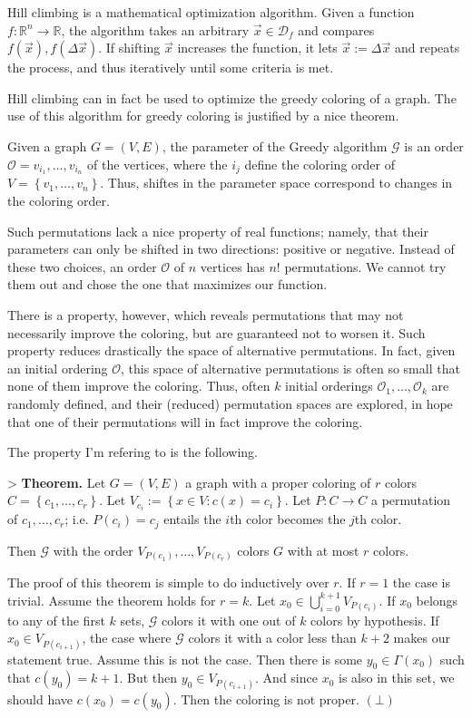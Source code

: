 \documentclass[a4paper, 12pt]{article}
\begin{document}
Hill climbing is a mathematical optimization algorithm. Given a function $f :
\mathbb{R}^n \to \mathbb{R}$, the algorithm takes an arbitrary
$\overrightarrow{x} \in \mathcal{D}_f$ and compares $f(\overrightarrow{x}),
f(\Delta \overrightarrow{x})$. If shifting $\overrightarrow{x}$ increases the
function, it lets $\overrightarrow{x} := \Delta\overrightarrow{x}$ and repeats
the process, and thus iteratively until some criteria is met.

Hill climbing can in fact be used to optimize the greedy coloring of a graph.
The use of this algorithm for greedy coloring is justified by a nice theorem.

Given a graph $G = (V, E)$, the parameter of the Greedy algorithm $\mathcal{G}$
is an order $\mathcal{O} = v_{i_1}, \ldots, v_{i_n}$ of the vertices, where the
$i_j$ define the coloring order of $V = \left\{ v_1, \ldots, v_n \right\} $.
Thus, shiftes in the parameter space correspond to changes
in the coloring order. 

Such permutations lack a nice property of real functions; namely, that their
parameters can only be shifted in two directions: positive or negative. Instead
of these two choices, an order $\mathcal{O}$ of $n$ vertices has $n!$
permutations. We cannot try them out and chose the one that maximizes our
function.

There is a property, however, which reveals permutations that may not
necessarily improve the coloring, but are guaranteed not to worsen it. Such
property reduces drastically the space of alternative permutations. In fact,
given an initial ordering $\mathcal{O}$, this space of alternative permutations
is often so small that none of them improve the coloring. Thus, often $k$
initial orderings $\mathcal{O}_1, \ldots, \mathcal{O}_k$ are randomly defined,
and their (reduced) permutation spaces are explored, in hope that one of their
permutations will in fact improve the coloring. 

The property I'm refering to is the following.

> \textbf{Theorem.} Let $G = (V, E)$ a graph with a proper coloring of $r$
colors $C = \left\{ c_1, \ldots, c_r \right\} $. Let $V_{c_i} := \left\{ x\in V
: c(x) =c_i \right\} $. Let $P : C \to C $ a permutation of $c_1, \ldots, c_r$;
i.e. $P(c_i) = c_j$ entails the $i$th color becomes the $j$th color.

Then $\mathcal{G}$ with the order $V_{P(c_1)}, \ldots, V_{P(c_r)}$ colors 
$G$ with at most $r$ colors.


The proof of this theorem is simple to do inductively over $r$. If $r = 1$ the
case is trivial. Assume the theorem holds for $r = k$. Let $x_0 \in
\bigcup_{i=0}^{k+1} V_{P(c_{i})}$. If $x_0$ belongs to any of the first $k$
sets, $\mathcal{G}$ colors it with one out of $k$ colors by hypothesis.
If $x_0 \in V_{P(c_{i+1})}$, the case where $\mathcal{G}$
colors it with a color less than $k+2$ makes our statement true.
Assume this is not the case. Then there is some $y_0 \in \Gamma(x_0)$
such that $c(y_0) = k + 1$. But then $y_0 \in V_{P(c_{i+1})}$.
And since $x_0$ is also in this set, we should have $c(x_0) = c(y_0)$.
Then the coloring is not proper. $(\bot)$
\end{document}
